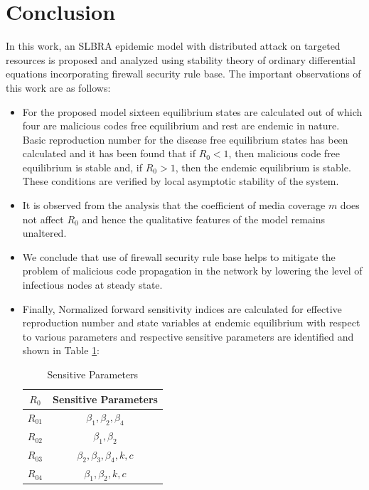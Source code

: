 \documentclass[conference]{IEEEtran}
\begin{document}
\section{Conclusion}
In this work, an SLBRA epidemic model with distributed
attack on targeted resources is proposed and analyzed using stability theory of ordinary differential equations incorporating firewall security rule base. The important observations of this work are as follows:
\begin{itemize}
\item
For the proposed model sixteen equilibrium states are calculated out of which four are malicious codes free equilibrium and rest are endemic in nature. Basic reproduction number for
the disease free equilibrium states has been calculated and it has been found that if $R_{0} < 1$, then malicious code free equilibrium is stable and, if $R_{0} > 1$,
then the endemic equilibrium is stable. These conditions are verified by local
asymptotic stability of the system.

%
%

\item
It is observed from the analysis that the coefficient of media coverage $m$ does not affect $R_{0}$ and hence the qualitative features of the model remains unaltered.

\item
We conclude that use of firewall security rule base helps to mitigate the problem of malicious code propagation in the network by lowering the level of infectious nodes at steady state.

\item
Finally, Normalized forward sensitivity indices are calculated for effective reproduction
number and state variables at endemic equilibrium with respect to various parameters and respective sensitive parameters are identified and shown in Table \ref{T2n}:

\begin{table}[ht!]
\caption{Sensitive Parameters}
\centering
\begin{tabular}{ |c|c| }
 \hline
  $R_{0}$ & Sensitive Parameters\\
  \hline
  $R_{01}$                  & $\beta_1,\beta_2,\beta_4$\\
  $R_{02}$                  & $\beta_1,\beta_2$  \\
  $R_{03}$                  & $\beta_2,\beta_3,\beta_4,k,c$ \\
  $R_{04}$                  & $\beta_1,\beta_2 ,k,c$\\
 \hline
\end{tabular} \label{T2n}
\end{table}
\end{itemize}
\end{document}
